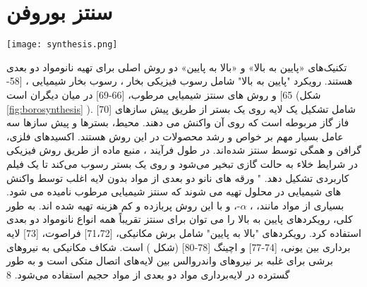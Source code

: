 \section{سنتز بوروفن}
\begin{figure*}
    \texttt{[image: synthesis.png]}
    \caption{روش سنتز اصلی نانوصفحات دو بعدی الف) روش پایین به بالا: CVD، PVD، و مواد شیمیایی مرطوب. ب) روش بالا به پایین: برش مکانیکی، فراصوت، لایه برداری بین یونی، اچ کردن انتخابی، و اچ اکسیداسیون حرارتی.}
    \label{fig:borosynthesis}
\end{figure*}
تکنیک‌های «پایین به بالا» و «بالا به پایین» دو روش اصلی برای تهیه نانومواد دو بعدی هستند. رویکرد "پایین به بالا" شامل رسوب فیزیکی بخار ، \cite{parkCrystallizationInducedPropertiesMorphologyControlled2014, zhaoPatternedGrowthVertically2010, zhaoVerticalOrganicNanowire2009} رسوب بخار شیمیایی ،\cite{zhangReviewChemicalVapor2013, akhavanToxicityGrapheneGraphene2010} [58-65] و روش های سنتز شیمیایی مرطوب، \cite{hanSynthesisStructuralTransformations2013, wuWelldefinedBiOClColloidal2015}[66-69] در میان دیگران است (شکل \ref{fig:borosynthesis} ). \cite{mannixSynthesisChemistryElemental2017}[70]  شامل تشکیل یک لایه روی یک بستر از طریق پیش سازهای فاز گاز مربوطه است که روی آن واکنش می دهند. محیط، بسترها و پیش سازها سه عامل بسیار مهم بر خواص و رشد محصولات در این روش هستند. اکسیدهای فلزی، گرافن و  همگی توسط  سنتز شده‌اند. در طول فرآیند ، منبع ماده از طریق روش فیزیکی در شرایط خلاء به حالت گازی تبخیر می‌شود و روی یک بستر رسوب می‌کند تا یک فیلم کاربردی تشکیل دهد. "
ورقه های نانو دو بعدی از مواد بدون لایه اغلب توسط واکنش های شیمیایی در محلول تهیه می شوند که سنتز شیمیایی مرطوب نامیده می شود. بسیاری از مواد مانند، ، $\alpha$-،  و  با این روش پربازده و کم هزینه تهیه شده اند. به طور کلی، رویکردهای پایین به بالا را می توان برای سنتز تقریباً همه انواع نانومواد دو بعدی استفاده کرد. رویکردهای "بالا به پایین" شامل برش مکانیکی، \cite{liPreparationApplicationsMechanically2014, yiReviewMechanicalExfoliation2015}[71،72] فراصوت، \cite{nicolosiLiquidExfoliationLayered2013}[73] لایه برداری بین یونی، \cite{yuwenRapidPreparationSinglelayer2016, zengSingleLayerSemiconductingNanosheets2011}[74-77] و اچینگ \cite{anasoriTwoDimensionalOrderedDouble2015, naguibNewTwoDimensionalNiobium2013, naguibTwoDimensionalNanocrystalsProduced2011}[78-80] (شکل ) است. شکاف مکانیکی به نیروهای برشی برای غلبه بر نیروهای واندروالس بین لایه‌های اتصال متکی است و به طور گسترده در لایه‌برداری مواد دو بعدی از مواد حجیم استفاده می‌شود. 8
